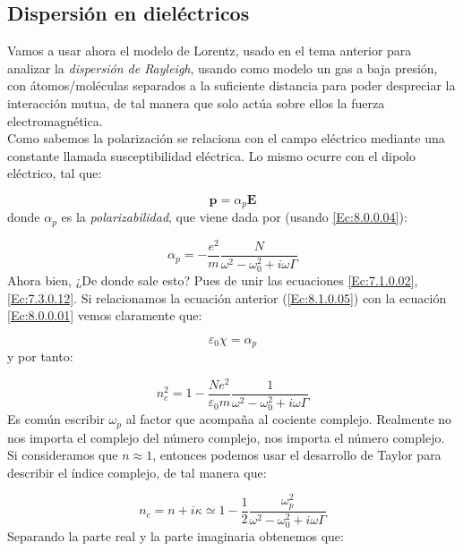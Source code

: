 \documentclass[12pt,a4paper]{article}
\newcommand{\En}{\mathbf{E}}
\newcommand{\pn}{\mathbf{p}}
\numberwithin{equation}{section}
\numberwithin{figure}{section}
\begin{document}
\subsection{Dispersión en dieléctricos}

Vamos a usar ahora el modelo de Lorentz, usado en el tema anterior para analizar la \textit{dispersión de Rayleigh}, usando como modelo un gas a baja presión, con átomos/moléculas separados a la suficiente distancia para poder despreciar la interacción mutua, de tal manera que solo actúa sobre ellos la fuerza electromagnética. \\

Como sabemos la polarización se relaciona con el campo eléctrico mediante una constante llamada susceptibilidad eléctrica. Lo mismo ocurre con el dipolo eléctrico, tal que:

\begin{equation}
\pn = \alpha_p \En
\end{equation}
donde $\alpha_p$ es la \textit{polarizabilidad}, que viene dada por (usando \ref{Ec:8.0.0.04}):

\begin{equation}
\alpha_p = - \dfrac{e^2}{m} \dfrac{N}{\omega^2 - \omega_0^2 + i \omega \Gamma} \label{Ec:8.1.0.05}
\end{equation}
Ahora bien, ¿De donde sale esto? Pues de unir las ecuaciones \ref{Ec:7.1.0.02}, \ref{Ec:7.3.0.12}. Si relacionamos la ecuación anterior (\ref{Ec:8.1.0.05}) con la  ecuación \ref{Ec:8.0.0.01} vemos claramente que:

\begin{equation}
\varepsilon_0 \chi = \alpha_p
\end{equation}
y por tanto:

\begin{equation}
n^2_c = 1 - \dfrac{N e^2}{\varepsilon_0 m} \dfrac{1}{\omega^2 - \omega^2_0 + i \omega \Gamma} \label{Ec:8.1.0.07}
\end{equation}
Es común escribir $\omega_p$ al factor que acompaña al cociente complejo. Realmente no nos importa el complejo del número complejo, nos importa el número complejo. Si consideramos que $n \approx 1$, entonces podemos usar el desarrollo de Taylor para describir el índice complejo, de tal manera que:

\begin{equation}
n_c = n + i \kappa \simeq 1 - \dfrac{1}{2} \dfrac{\omega_p^2}{\omega^2 - \omega_0^2 + i \omega \Gamma}
\end{equation}
Separando la parte real y la parte imaginaria obtenemos que:
\end{document}

